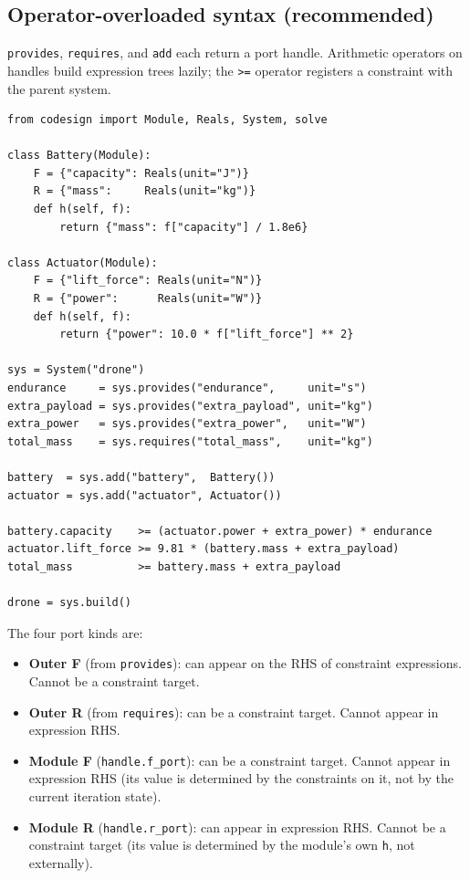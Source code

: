 \documentclass[11pt,a4paper]{article}
\begin{document}
\subsection{Operator-overloaded syntax (recommended)}

\texttt{provides}, \texttt{requires}, and \texttt{add} each return a
port handle. Arithmetic operators on handles build expression trees
lazily; the \texttt{>=} operator registers a constraint with the parent
system.

\begin{lstlisting}
from codesign import Module, Reals, System, solve

class Battery(Module):
    F = {"capacity": Reals(unit="J")}
    R = {"mass":     Reals(unit="kg")}
    def h(self, f):
        return {"mass": f["capacity"] / 1.8e6}

class Actuator(Module):
    F = {"lift_force": Reals(unit="N")}
    R = {"power":      Reals(unit="W")}
    def h(self, f):
        return {"power": 10.0 * f["lift_force"] ** 2}

sys = System("drone")
endurance     = sys.provides("endurance",     unit="s")
extra_payload = sys.provides("extra_payload", unit="kg")
extra_power   = sys.provides("extra_power",   unit="W")
total_mass    = sys.requires("total_mass",    unit="kg")

battery  = sys.add("battery",  Battery())
actuator = sys.add("actuator", Actuator())

battery.capacity    >= (actuator.power + extra_power) * endurance
actuator.lift_force >= 9.81 * (battery.mass + extra_payload)
total_mass          >= battery.mass + extra_payload

drone = sys.build()
\end{lstlisting}

The four port kinds are:

\begin{itemize}[leftmargin=2em]
  \item \textbf{Outer F} (from \texttt{provides}): can appear on the RHS
        of constraint expressions. Cannot be a constraint target.
  \item \textbf{Outer R} (from \texttt{requires}): can be a constraint
        target. Cannot appear in expression RHS.
  \item \textbf{Module F} (\texttt{handle.f\_port}): can be a constraint
        target. Cannot appear in expression RHS (its value is determined
        by the constraints on it, not by the current iteration state).
  \item \textbf{Module R} (\texttt{handle.r\_port}): can appear in
        expression RHS. Cannot be a constraint target (its value is
        determined by the module's own \texttt{h}, not externally).
\end{itemize}
\end{document}
